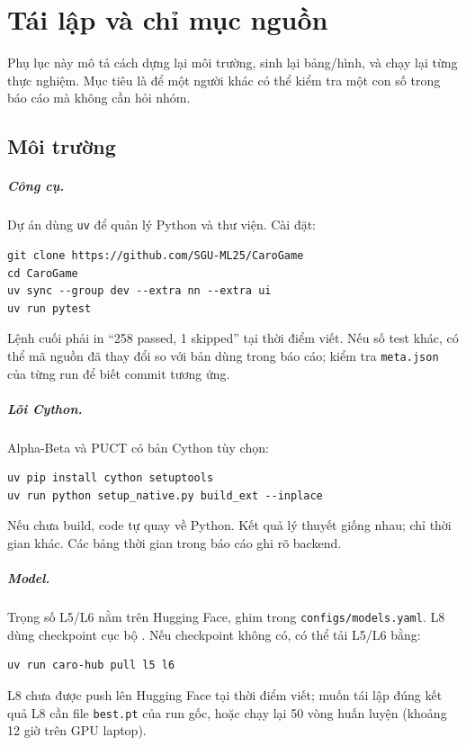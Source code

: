 \chapter{Tái lập và chỉ mục nguồn}
\label{app:tai-lap}

Phụ lục này mô tả cách dựng lại môi trường, sinh lại bảng/hình, và chạy lại từng thực nghiệm.
Mục tiêu là để một người khác có thể kiểm tra một con số trong báo cáo mà không cần hỏi nhóm.

\section{Môi trường}
\paragraph{Công cụ.} Dự án dùng \texttt{uv} để quản lý Python và thư viện. Cài đặt:
\begin{lstlisting}[numbers=none]
git clone https://github.com/SGU-ML25/CaroGame
cd CaroGame
uv sync --group dev --extra nn --extra ui
uv run pytest
\end{lstlisting}
Lệnh cuối phải in ``258 passed, 1 skipped'' tại thời điểm viết. Nếu số test khác, có thể mã
nguồn đã thay đổi so với bản dùng trong báo cáo; kiểm tra \texttt{meta.json} của từng run để
biết commit tương ứng.

\paragraph{Lõi Cython.} Alpha-Beta và PUCT có bản Cython tùy chọn:
\begin{lstlisting}[numbers=none]
uv pip install cython setuptools
uv run python setup_native.py build_ext --inplace
\end{lstlisting}
Nếu chưa build, code tự quay về Python. Kết quả lý thuyết giống nhau; chỉ thời gian khác. Các
bảng thời gian trong báo cáo ghi rõ backend.

\paragraph{Model.} Trọng số L5/L6 nằm trên Hugging Face, ghim trong \texttt{configs/models.yaml}.
L8 dùng checkpoint cục bộ .
Nếu checkpoint không có, có thể tải L5/L6 bằng:
\begin{lstlisting}[numbers=none]
uv run caro-hub pull l5 l6
\end{lstlisting}
L8 chưa được push lên Hugging Face tại thời điểm viết; muốn tái lập đúng kết quả L8 cần file
\texttt{best.pt} của run gốc, hoặc chạy lại 50 vòng huấn luyện (khoảng 12 giờ trên GPU laptop).

